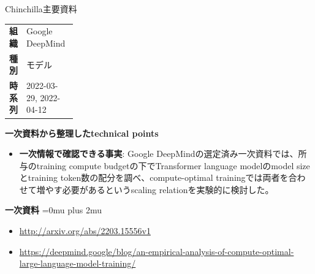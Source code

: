 \begin{technicalnote}{Chinchilla}{主要資料}
\begingroup
\begin{tabularx}{\linewidth}{@{}>{\bfseries}p{0.22\linewidth}X@{}}
組織 & Google DeepMind \\
種別 & モデル \\
時系列 & 2022-03-29, 2022-04-12 \\
\end{tabularx}
\smallskip
{\bfseries 一次資料から整理したtechnical points}
\begin{itemize}[leftmargin=1.5em,itemsep=0.35em]
\item \textbf{一次情報で確認できる事実}: Google DeepMindの選定済み一次資料では、所与のtraining compute budgetの下でTransformer language modelのmodel sizeとtraining token数の配分を調べ、compute-optimal trainingでは両者を合わせて増やす必要があるというscaling relationを実験的に検討した。
\end{itemize}
\begin{minipage}{\linewidth}
\begin{samepage}
{\bfseries 一次資料}
\begingroup\sloppy
\Urlmuskip=0mu plus 2mu\relax
\begin{itemize}[leftmargin=1.5em,itemsep=0.25em]
\item {\scriptsize\url{http://arxiv.org/abs/2203.15556v1}}
\item {\scriptsize\url{https://deepmind.google/blog/an-empirical-analysis-of-compute-optimal-large-language-model-training/}}
\end{itemize}
\endgroup
\end{samepage}
\end{minipage}
\endgroup
\end{technicalnote}
\medskip

